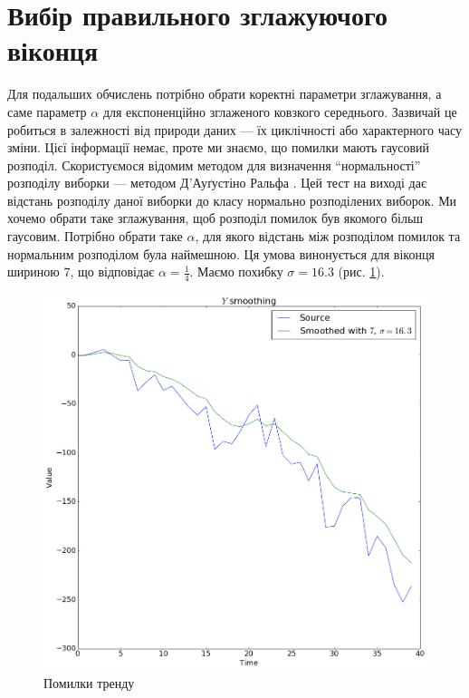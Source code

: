 \section{Вибір правильного зглажуючого віконця}

Для подальших обчислень потрібно обрати коректні параметри зглажування,
а саме параметр $\alpha$ для експоненційно зглаженого ковзкого середнього.
Зазвичай це робиться в залежності від природи даних ---
їх циклічності або характерного часу зміни.
Цієї інформації немає, проте ми знаємо, що помилки мають гаусовий розподіл.
Скористуємося відомим методом
для визначення ``нормальності'' розподілу виборки ---
методом Д'Ауґустіно Ральфа \cite{dago1990}.
Цей тест на виході дає відстань розподілу даної виборки
до класу нормально розподілених виборок.
Ми хочемо обрати таке зглажування,
щоб розподіл помилок був якомого більш гаусовим.
Потрібно обрати таке $\alpha$,
для якого відстань між розподілом помилок та нормальним розподілом
була наймешною.
Ця умова винонується для віконця шириною $7$,
що відповідає $\alpha = \frac{1}{4}$.
Маємо похибку $\sigma = 16.3$ (рис. \ref{fig:span:fixed}).

\begin{figure}[h!]
  \centering
  \includegraphics[width=\textwidth]{Coursework_files/Coursework_24_0.png}
  \caption{Помилки тренду}
  \label{fig:span:fixed}
\end{figure}


